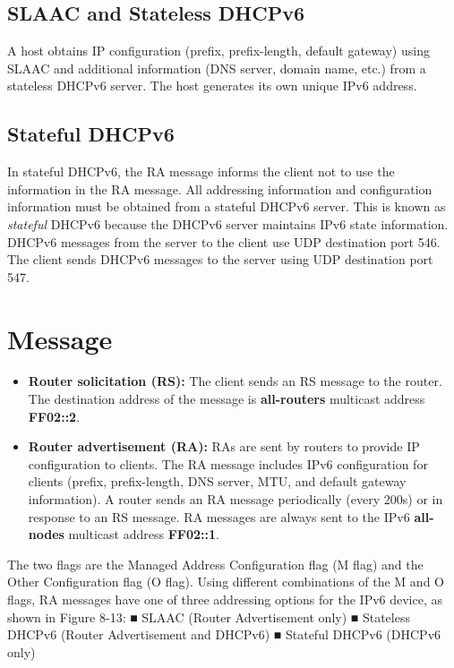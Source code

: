 \subsection{SLAAC and Stateless DHCPv6}

A host obtains IP configuration (prefix, prefix-length, default gateway) using SLAAC and additional information (DNS server, domain name, etc.) from a stateless DHCPv6 server. The host generates its own unique IPv6 address. 

\subsection{Stateful DHCPv6}

In stateful DHCPv6, the RA message informs the client not to use the information in the RA message. All addressing information and configuration information must be obtained from a stateful DHCPv6 server. This is known as \emph{stateful} DHCPv6 because the DHCPv6 server maintains IPv6 state information.\\

DHCPv6 messages from the server to the client use UDP destination port 546. The client sends DHCPv6 messages to the server using UDP destination port 547.

\section{Message}

\begin{itemize}
\item \textbf{Router solicitation (RS):} The client sends an RS message to the router. The destination address of the message is \textbf{all-routers} multicast address \textbf{FF02::2}.

\item \textbf{Router advertisement (RA):} RAs are sent by routers to provide IP configuration to clients. The RA message includes IPv6 configuration for clients (prefix, prefix-length, DNS server, MTU, and default gateway information). A router sends an RA message periodically (every 200s) or in response to an RS message. RA messages are always sent to the IPv6 \textbf{all-nodes} multicast address \textbf{FF02::1}.
\end{itemize}

The two flags are the Managed Address Configuration flag (M flag) and the
Other Configuration flag (O flag).
Using different combinations of the M and O flags, RA messages have one of three
addressing options for the IPv6 device, as shown in Figure 8-13:
■ SLAAC (Router Advertisement only)
■ Stateless DHCPv6 (Router Advertisement and DHCPv6)
■ Stateful DHCPv6 (DHCPv6 only)


